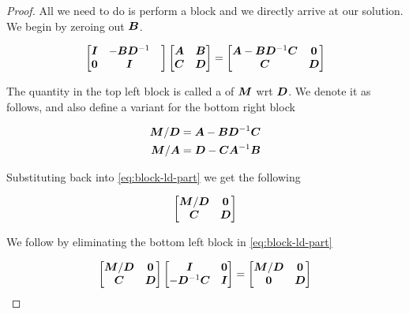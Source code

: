 \begin{proof}
All we need to do is perform a block  and we directly arrive at our solution. We begin by zeroing out ${\bm{B}}$.

\begin{equation} \label{eq:block-ld-part}
\begin{bmatrix} {\bm{I}} & -{\bm{B}} {\bm{D}}^{-1} & \\ {\bm{0}} & {\bm{I}} \end{bmatrix}
\begin{bmatrix}{\bm{A}} & {\bm{B}} \\ {\bm{C}} & {\bm{D}} \end{bmatrix} =
\begin{bmatrix} {\bm{A}} - {\bm{B}} {\bm{D}}^{-1} {\bm{C}} & {\bm{0}} \\ {\bm{C}} & {\bm{D}} \end{bmatrix}
\end{equation}

The quantity in the top left block is called a  of ${\bm{M}}$ wrt ${\bm{D}}$. We denote it as follows, and also define a variant for the bottom right block

\begin{align}
{\bm{M}}/{\bm{D}} &= {\bm{A}} - {\bm{B}} {\bm{D}}^{-1} {\bm{C}} \\
{\bm{M}}/{\bm{A}} &= {\bm{D}} - {\bm{C}} {\bm{A}}^{-1} {\bm{B}}
\end{align}

Substituting back into \eqref{eq:block-ld-part} we get the following

\begin{equation}
\begin{bmatrix} {\bm{M}}/{\bm{D}} & {\bm{0}} \\ {\bm{C}} & {\bm{D}} \end{bmatrix}
\end{equation}

We follow by eliminating the bottom left block in \eqref{eq:block-ld-part}

\begin{equation} \label{eq:block-du-part}
\begin{bmatrix} {\bm{M}}/{\bm{D}} & {\bm{0}} \\ {\bm{C}} & {\bm{D}} \end{bmatrix}
\begin{bmatrix} {\bm{I}} & {\bm{0}} \\ -{\bm{D}}^{-1} {\bm{C}} & {\bm{I}} \end{bmatrix} =
\begin{bmatrix} {\bm{M}}/{\bm{D}} & {\bm{0}} \\ {\bm{0}} & {\bm{D}} \end{bmatrix}
\end{equation}


\end{proof}
